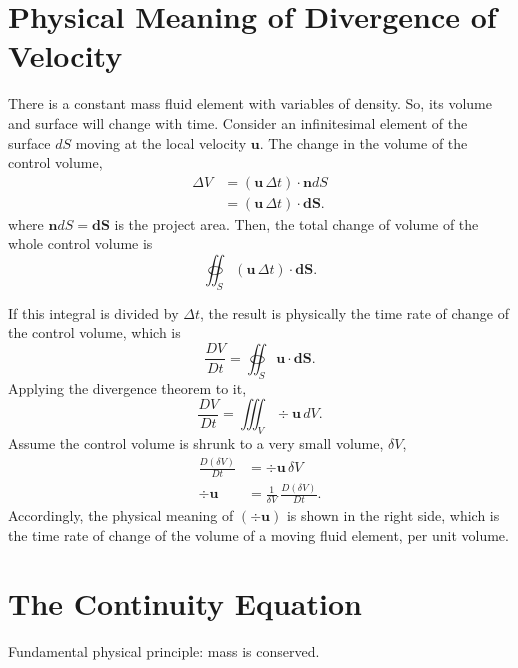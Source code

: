 \section{Physical Meaning of Divergence of Velocity}
There is a constant mass fluid element with variables of density. 
So, its volume and surface will change with time. 
Consider an infinitesimal element of the surface $dS$ moving at the local velocity $\bm{u}$. 
The change in the volume of the control volume, 
\begin{equation}
\begin{aligned}
    \Delta V &= (\bm{u}\,\Delta t)\cdot \bm{n}dS \\
    &= (\bm{u}\,\Delta t)\cdot \bm{dS}.
\end{aligned}
\end{equation}
where $\bm{n}dS = \bm{dS}$ is the project area. 
Then, the total change of volume of the whole control volume is 
\begin{equation}
    \oiint_S (\bm{u}\,\Delta t)\cdot \bm{dS}. 
\end{equation}

If this integral is divided by $\Delta t$, the result is physically the time rate of change of the control volume, which is 
\begin{equation}
    \frac{D V}{D t} =
    \oiint_S \bm{u}\cdot \bm{dS}. 
\end{equation}
Applying the divergence theorem to it, 
\begin{equation}
    \frac{D V}{D t} =
    \iiint_V \div \bm{u} \, dV. 
\end{equation}
Assume the control volume is shrunk to a very small volume, $\delta V$, 
\begin{equation}
\begin{aligned}
    \frac{D(\delta V)}{Dt} 
    &= \div \bm{u} \, \delta V \\
    \div \bm{u} 
    &= \frac{1}{\delta V}\, \frac{D(\delta V)}{Dt}.
\end{aligned}
\end{equation}
Accordingly, the physical meaning of $(\div \bm{u})$ is shown in the right side, which is the time rate of change of the volume of a moving fluid element, per unit volume. 

\section{The Continuity Equation}
Fundamental physical principle: mass is conserved. 
